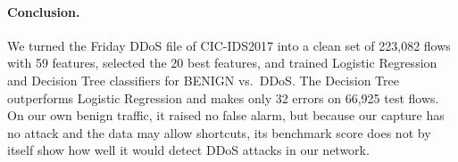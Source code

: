 \paragraph{Conclusion.} We turned the Friday DDoS file of CIC-IDS2017 into a clean set of 223,082 flows with 59 features, selected the 20 best features, and trained Logistic Regression and Decision Tree classifiers for BENIGN vs.\ DDoS. The Decision Tree outperforms Logistic Regression and makes only 32 errors on 66,925 test flows. On our own benign traffic, it raised no false alarm, but because our capture has no attack and the data may allow shortcuts, its benchmark score does not by itself show how well it would detect DDoS attacks in our network.
